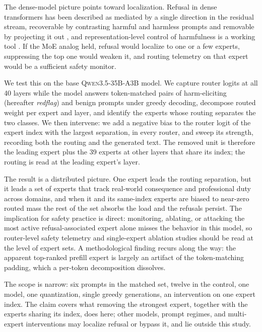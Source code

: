 \documentclass[10pt,twocolumn]{article}
\begin{document}
The dense-model picture points toward localization. Refusal in dense
transformers has been described as mediated by a single direction in the
residual stream, recoverable by contrasting harmful and harmless prompts and
removable by projecting it out \citep{arditi2024refusal}, and
representation-level control of harmfulness is a working tool
\citep{zou2023representation}. If the MoE analog held, refusal would localize
to one or a few experts, suppressing the top one would weaken it, and routing
telemetry on that expert would be a sufficient safety monitor.

We test this on the base \textsc{Qwen3.5-35B-A3B} model. We capture router
logits at all 40 layers while the model answers token-matched pairs of
harm-eliciting (hereafter \emph{redflag}) and benign prompts under greedy
decoding, decompose routed weight per expert and layer, and identify the
experts whose routing separates the two classes. We then intervene: we add a
negative bias to the router logit of the expert index with the largest
separation, in every router, and sweep its strength, recording both the
routing and the generated text. The removed unit is therefore the leading
expert plus the 39 experts at other layers that share its index; the routing
is read at the leading expert's layer.

The result is a distributed picture. One expert leads the routing separation,
but it leads a set of experts that track real-world consequence and
professional duty across domains, and when it and its same-index experts are
biased to near-zero routed mass the rest of the set absorbs the load and the
refusals persist. The
implication for safety practice is direct: monitoring, ablating, or attacking
the most active refusal-associated expert alone misses the behavior in this
model, so router-level safety telemetry \citep{lv2026routescan} and
single-expert ablation studies should be read at the level of expert sets. A
methodological finding recurs along the way: the apparent top-ranked prefill
expert is largely an artifact of the token-matching padding, which a per-token
decomposition dissolves.

The scope is narrow: six prompts in the matched set, twelve in the control,
one model, one quantization, single greedy generations, an intervention on
one expert index. The claim covers what removing the strongest expert,
together with the experts sharing its index, does here; other models, prompt regimes, and multi-expert interventions may
localize refusal or bypass it, and lie outside this study.
\end{document}
